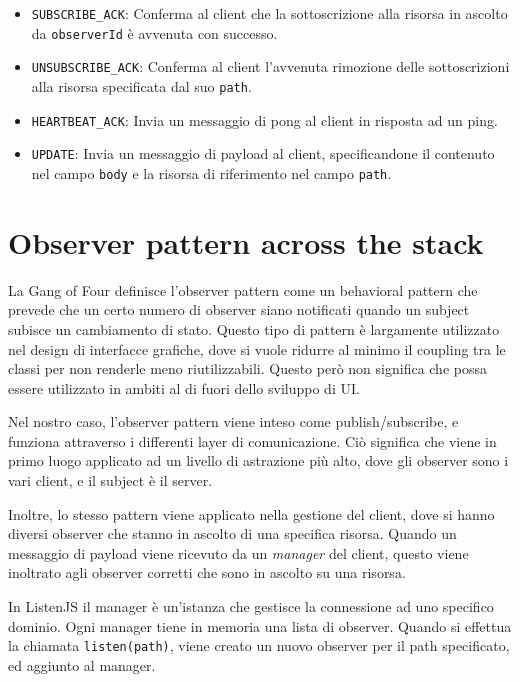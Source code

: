 \documentclass[12pt,a4paper,openright,twoside]{report}
\begin{document}
\begin{itemize}
\begin{itemize}
  \item \lstinline{SUBSCRIBE_ACK}: Conferma al client che la sottoscrizione alla risorsa in ascolto da \lstinline{observerId} è avvenuta con successo.
  \item \lstinline{UNSUBSCRIBE_ACK}: Conferma al client l'avvenuta rimozione delle sottoscrizioni alla risorsa specificata dal suo \lstinline{path}.
  \item \lstinline{HEARTBEAT_ACK}: Invia un messaggio di pong al client in risposta ad un ping.
  \item \lstinline{UPDATE}: Invia un messaggio di payload al client, specificandone il contenuto nel campo \lstinline{body} e la risorsa di riferimento nel campo \lstinline{path}.
  \end{itemize}
\end{itemize}

\section{Observer pattern across the stack}
La Gang of Four definisce l'observer pattern\cite{observer} come un behavioral pattern che prevede che un certo numero di observer siano notificati quando un subject subisce un cambiamento di stato. Questo tipo di pattern è largamente utilizzato nel design di interfacce grafiche, dove si vuole ridurre al minimo il coupling tra le classi per non renderle meno riutilizzabili. Questo però non significa che possa essere utilizzato in ambiti al di fuori dello sviluppo di UI.

\bigskip

Nel nostro caso, l'observer pattern viene inteso come publish/subscribe, e funziona attraverso i differenti layer di comunicazione. Ciò significa che viene in primo luogo applicato ad un livello di astrazione più alto, dove gli observer sono i vari client, e il subject è il server.

Inoltre, lo stesso pattern viene applicato nella gestione del client, dove si hanno diversi observer che stanno in ascolto di una specifica risorsa. Quando un messaggio di payload viene ricevuto da un \textit{manager} del client, questo viene inoltrato agli observer corretti che sono in ascolto su una risorsa.

In ListenJS il manager è un'istanza che gestisce la connessione ad uno specifico dominio. Ogni manager tiene in memoria una lista di observer. Quando si effettua la chiamata \lstinline{listen(path)}, viene creato un nuovo observer per il path specificato, ed aggiunto al manager.
\end{document}
